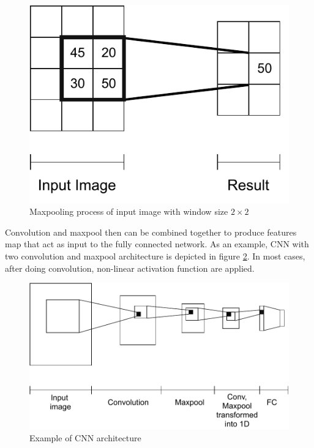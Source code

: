     \begin{figure}
        \centering
        \includegraphics[width=.4\linewidth]{images/maxpool.pdf}
        \caption{Maxpooling process of input image with window size $2\times2$}
        \label{fig:maxpool}
    \end{figure}

    Convolution and maxpool then can be combined together to produce
    features map that act as input to the fully connected network. As
    an example, CNN with two convolution and maxpool architecture is
    depicted in figure \ref{fig:cnn}. In most cases, after doing
    convolution, non-linear activation function are applied.
    
    \begin{figure}
        \centering
        \includegraphics[width=.8\linewidth]{images/cnn.pdf}
        \caption{Example of CNN architecture}
        \label{fig:cnn}
    \end{figure}

